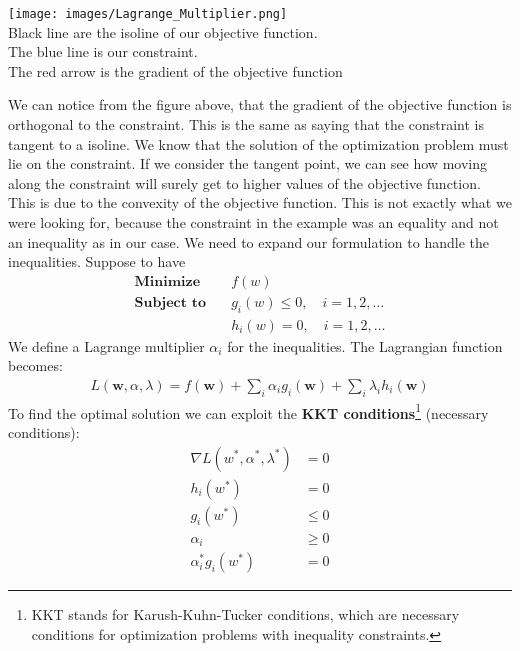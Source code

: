 \documentclass[../main.tex]{subfiles}
\begin{document}
\begin{center}
    \texttt{[image: images/Lagrange\_Multiplier.png]} \\
    Black line are the isoline of our objective function. \\
    The blue line is our constraint. \\
    The red arrow is the gradient of the objective function
\end{center}
We can notice from the figure above, that the gradient of the objective function is orthogonal to the constraint. This is the same as saying that the constraint is tangent to a isoline. We know that the solution of the optimization problem must lie on the constraint. If we consider the tangent point, we can see how moving along the constraint will surely get to higher values of the objective function. This is due to the convexity of the objective function.
\newline
This is not exactly what we were looking for, because the constraint in the example was an equality and not an inequality as in our case. We need to expand our formulation to handle the inequalities. Suppose to have
\begin{align*}
    \textbf{Minimize} \quad   & f(w)                             \\
    \textbf{Subject to} \quad & g_i(w) \leq 0, \quad i=1,2,\dots \\
                              & h_i(w) = 0, \quad i=1,2,\dots
\end{align*}
We define a Lagrange multiplier $\alpha_i$ for the inequalities. The Lagrangian function becomes:
\begin{align*}
    L(\mathbf{w}, \alpha, \lambda) = f(\mathbf{w}) + \sum_i \alpha_i g_i(\mathbf{w}) + \sum_i \lambda_i h_i(\mathbf{w})
\end{align*}
To find the optimal solution we can exploit the \textbf{KKT conditions}\footnote{KKT stands for Karush-Kuhn-Tucker conditions, which are necessary conditions for optimization problems with inequality constraints.} (necessary conditions):
\begin{align*}
    \nabla L(w^*,\alpha^*,\lambda^*) & = 0    \\
    h_i(w^*)                         & = 0    \\
    g_i(w^*)                         & \leq 0 \\
    \alpha_i                         & \geq 0 \\
    \alpha_i^* g_i(w^*)              & = 0
\end{align*}
\end{document}
